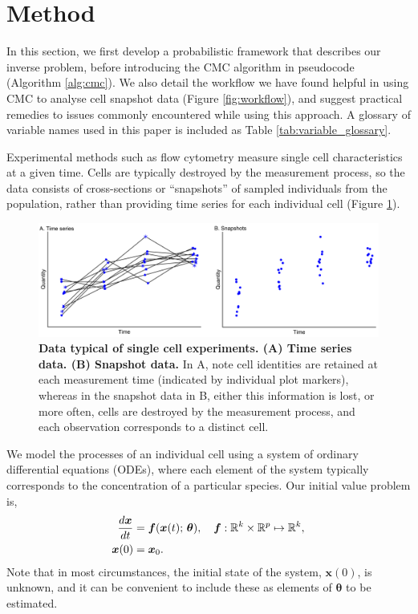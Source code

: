 \section{Method}\label{sec:method}
In this section, we first develop a probabilistic framework that describes our inverse problem, before introducing the CMC algorithm in pseudocode (Algorithm \ref{alg:cmc}). We also detail the workflow we have found helpful in using CMC to analyse cell snapshot data (Figure \ref{fig:workflow}), and suggest practical remedies to issues commonly encountered while using this approach. A glossary of variable names used in this paper is included as Table \ref{tab:variable_glossary}.

Experimental methods such as flow cytometry measure single cell characteristics at a given time. Cells are typically destroyed by the measurement process, so the data consists of cross-sections or ``snapshots'' of sampled individuals from the population, rather than providing time series for each individual cell (Figure \ref{fig:time_series_v_snapshots}).

\begin{figure}[H]
  \centerline{\includegraphics[width=\textwidth]{../figures/time_series_v_snapshots.pdf}}
  \caption{\textbf{Data typical of single cell experiments. (A) Time series data. (B) Snapshot data.} In A, note cell identities are retained at each measurement time (indicated by individual plot markers), whereas in the snapshot data in B, either this information is lost, or more often, cells are destroyed by the measurement process, and each observation corresponds to a distinct cell.}
  \label{fig:time_series_v_snapshots}
\end{figure}

We model the processes of an individual cell using a system of ordinary differential equations (ODEs), where each element of the system typically corresponds to the concentration of a particular species. Our initial value problem is,
%
\begin{equation}\label{eq:ode}
\begin{aligned}
\frac{d\boldsymbol{x}}{dt} &= \boldsymbol{f}(\boldsymbol{x}(t); \, \boldsymbol{\theta}), \quad \boldsymbol{f}: \mathbb{R}^k \times \mathbb{R}^p \mapsto \mathbb{R}^k, \\
\boldsymbol{x}(0) &= \boldsymbol{x}_0.
\end{aligned}
\end{equation}
%
Note that in most circumstances, the initial state of the system, $\boldsymbol{x}(0)$, is unknown, and it can be convenient to include these as elements of $\boldsymbol{\theta}$ to be estimated.

